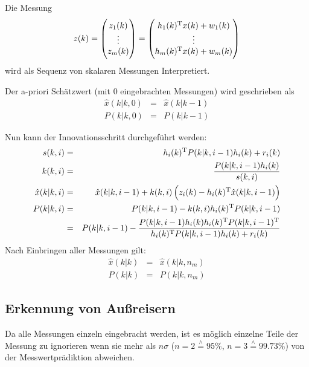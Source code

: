 Die Messung
\begin{equation*}
    z(k) =
        \begin{pmatrix}
            z_1(k) \\ \vdots \\ z_m(k)
        \end{pmatrix} = 
        \begin{pmatrix}
            h_1(k)^\text{T} x(k) + w_1(k) \\
            \vdots \\
            h_m(k)^\text{T} x(k) + w_m(k)
        \end{pmatrix}
\end{equation*}
wird als Sequenz von skalaren Messungen Interpretiert.

Der a-priori Schätzwert (mit $0$ eingebrachten Messungen) wird geschrieben als
\begin{eqnarray*}
    \hat{x}(k|k, 0) &=& \hat{x}(k|k-1) \\
    P(k|k, 0) &=& P(k|k-1)
\end{eqnarray*}

Nun kann der Innovationsschritt durchgeführt werden:
\begin{eqnarray*}
    s(k,i) &=& h_i(k)^\text{T} P(k|k, i-1) h_i(k) + r_i(k) \\
    k(k,i) &=& \frac{P(k|k, i-1)h_i(k)}{s(k,i)} \\
    \hat{x}(k|k, i) &=& \hat{x}(k|k, i-1) + k(k,i) \left(z_i(k) - h_i(k)^\text{T} \hat{x}(k|k, i-1)\right) \\
    P(k|k, i) &=& P(k|k, i-1) - k(k, i) h_i(k)^\text{T} P(k|k, i-1) \\
        &=& P(k|k, i-1) - \frac{P(k|k, i-1)h_i(k) h_i(k)^\text{T} P(k|k, i-1)^\text{T}}{h_i(k)^\text{T} P(k|k,i-1)h_i(k)+r_i(k)}
\end{eqnarray*}
Nach Einbringen aller Messungen gilt:
\begin{eqnarray*}
    \hat{x}(k|k) &=& \hat{x}(k|k, n_m) \\
    P(k|k) &=& P(k|k, n_m)
\end{eqnarray*}

\subsection{Erkennung von Außreisern}
Da alle Messungen einzeln eingebracht werden, ist es möglich einzelne Teile der Messung zu ignorieren wenn sie mehr als
$n \sigma$ ($n=2 \stackrel{\wedge}{=} 95\%$, $n=3 \stackrel{\wedge}{=} 99.73\%$) von der Messwertprädiktion abweichen.

